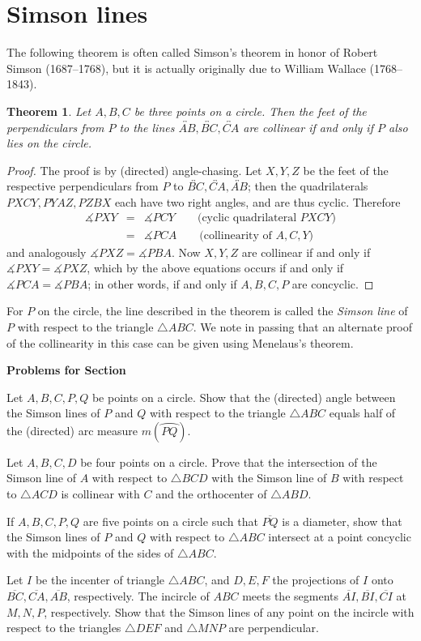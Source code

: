 \documentclass[12pt]{book}
\newcounter{exc}
\numberwithin{exc}{section}
\numberwithin{figure}{section}
\newenvironment{exer}{\vspace{0.1in}
\noindent \textbf{Problems for Section~\thesection} \vspace{0.1in}
\begin{list}{\arabic{exc}.}{\usecounter{exc}}}{\end{list}}
\newtheorem{theorem}{Theorem}[section]
\numberwithin{equation}{theorem}
\def\beqa{\begin{eqnarray*}}
\def\eeqa{\end{eqnarray*}}
\def\ii{\item}
\def\dang{\measuredangle} %
\def\line#1{\overleftrightarrow{#1}}
\def\seg#1{\overline{#1}}
\def\arc#1{\wideparen{#1}}
\begin{document}
\section{Simson lines}

The following theorem is often called Simson's theorem in honor
of Robert Simson (1687--1768), 
but it is actually originally due to
William Wallace (1768--1843). 

 
\begin{theorem}
Let $A,B,C$ be three points on a circle. Then the feet of the 
perpendiculars from $P$ to the lines $\line{AB}, \line{BC}, \line{CA}$ 
are collinear if  and only if $P$ also lies on the circle.
\end{theorem}
\begin{proof}
The proof is by (directed) angle-chasing. Let $X,Y,Z$ be the feet of 
the respective perpendiculars from $P$ to $\line{BC}, \line{CA}, \line{AB}$; 
then the
quadrilaterals $PXCY, PYAZ, PZBX$ each have two right angles, and are 
thus cyclic. Therefore
\beqa
\dang PXY &=& \dang PCY \qquad \mbox{(cyclic quadrilateral $PXCY$)} \\
&=& \dang PCA \qquad \mbox{(collinearity of $A, C, Y$)}
\eeqa
and analogously $\dang PXZ = \dang PBA$. Now $X, Y, Z$ are collinear 
if and only if $\dang PXY = \dang PXZ$, which by the above equations 
occurs if and only if $\dang PCA = \dang PBA$; in other words, if and 
only if $A, B, C, P$ are concyclic.
\end{proof}
For $P$ on the circle,
the line described in the theorem is called the \emph{Simson line} 
of $P$ with respect to the triangle $\triangle ABC$. 
We note in passing that an 
alternate proof of the collinearity in this case can be given using 
Menelaus's theorem.

\begin{exer}
\ii
Let $A,B,C,P,Q$ be points on a circle. Show that the (directed) angle between 
the Simson lines of $P$ and $Q$ with respect to the triangle $\triangle ABC$
equals half of the (directed) arc measure $m(\arc{PQ})$.
\ii \label{ex:simcon}
Let $A,B,C,D$ be four points on a circle. Prove that the intersection 
of the Simson line 
of $A$ with respect to $\triangle BCD$ with the Simson line of $B$ with 
respect to $\triangle ACD$ is collinear with $C$ and the orthocenter of 
$\triangle ABD$.
\ii \label{ex:postsim}
If $A, B, C, P, Q$ are five points on a circle such that $\seg{PQ}$ is a 
diameter, show that the Simson lines of $P$ and $Q$ with respect to 
$\triangle ABC$ intersect at a point concyclic with the midpoints of the sides 
of $\triangle ABC$. 
\ii
Let $I$ be the incenter of triangle $\triangle ABC$, and $D, E, F$ the
projections of $I$ onto $\seg{BC}, \seg{CA}, \seg{AB}$, 
respectively. The incircle of
$ABC$ meets the segments $\seg{AI}, \seg{BI}, \seg{CI}$ 
at $M, N, P$, respectively. Show
that the Simson lines of any point on the incircle with respect to the
triangles $\triangle DEF$ and $\triangle MNP$ are perpendicular.
\end{exer}
\end{document}
